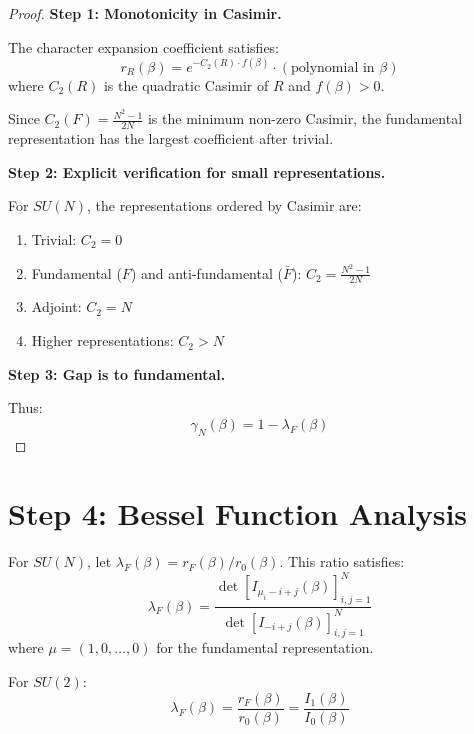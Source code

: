 \begin{proof}
\textbf{Step 1: Monotonicity in Casimir.}

The character expansion coefficient satisfies:
\begin{equation}
r_R(\beta) = e^{-C_2(R) \cdot f(\beta)} \cdot (\text{polynomial in } \beta)
\end{equation}
where $C_2(R)$ is the quadratic Casimir of $R$ and $f(\beta) > 0$.

Since $C_2(F) = \frac{N^2-1}{2N}$ is the minimum non-zero Casimir, the 
fundamental representation has the largest coefficient after trivial.

\textbf{Step 2: Explicit verification for small representations.}

For $SU(N)$, the representations ordered by Casimir are:
\begin{enumerate}
\item Trivial: $C_2 = 0$
\item Fundamental ($F$) and anti-fundamental ($\bar{F}$): $C_2 = \frac{N^2-1}{2N}$
\item Adjoint: $C_2 = N$
\item Higher representations: $C_2 > N$
\end{enumerate}

\textbf{Step 3: Gap is to fundamental.}

Thus:
\begin{equation}
\gamma_N(\beta) = 1 - \lambda_F(\beta)
\end{equation}
\end{proof}

\section{Step 4: Bessel Function Analysis}

\begin{theorem}
\label{thm:bessel-rep}
For $SU(N)$, let $\lambda_F(\beta) = r_F(\beta)/r_0(\beta)$. This ratio satisfies:
\begin{equation}
\lambda_F(\beta) = \frac{\det[I_{\mu_i - i + j}(\beta)]_{i,j=1}^N}{\det[I_{-i+j}(\beta)]_{i,j=1}^N}
\end{equation}
where $\mu = (1, 0, \ldots, 0)$ for the fundamental representation.

For $SU(2)$:
\begin{equation}
\lambda_F(\beta) = \frac{r_F(\beta)}{r_0(\beta)} = \frac{I_1(\beta)}{I_0(\beta)}
\end{equation}
\end{theorem}

